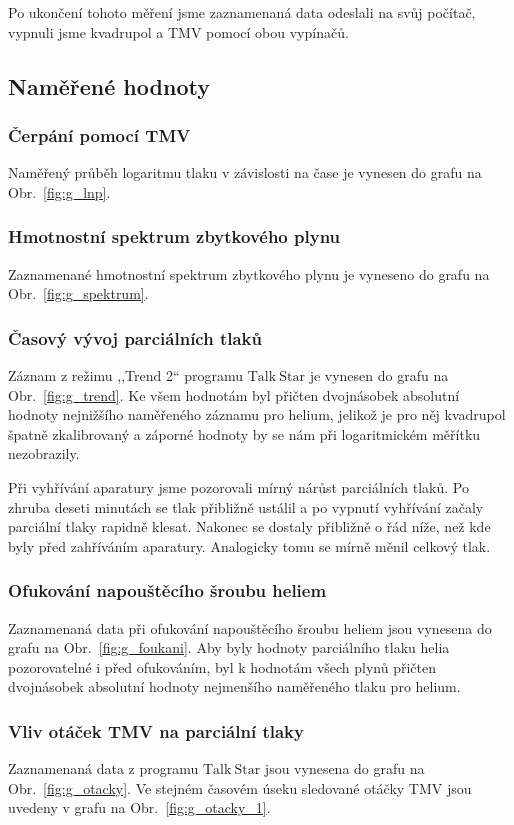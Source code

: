 \documentclass[english]{article}
\begin{document}
			Po ukončení tohoto měření jsme zaznamenaná data odeslali na svůj počítač, vypnuli jsme kvadrupol a TMV pomocí obou vypínačů.
		
	\subsection{Naměřené hodnoty}
		\subsubsection{Čerpání pomocí TMV}
			Naměřený průběh logaritmu tlaku v závislosti na čase je vynesen do grafu na Obr.~\ref{fig:g_lnp}.
			
		\subsubsection{Hmotnostní spektrum zbytkového plynu}
			Zaznamenané hmotnostní spektrum zbytkového plynu je vyneseno do grafu na Obr.~\ref{fig:g_spektrum}.
			
		\subsubsection{Časový vývoj parciálních tlaků}
			Záznam z režimu ,,Trend 2`` programu $\mathrm{Talk~Star}$ je vynesen do grafu na Obr.~\ref{fig:g_trend}. Ke všem hodnotám byl přičten dvojnásobek absolutní hodnoty nejnižšího naměřeného záznamu pro helium, jelikož je pro něj kvadrupol špatně zkalibrovaný a záporné hodnoty by se nám při logaritmickém měřítku nezobrazily.
			
			Při vyhřívání aparatury jsme pozorovali mírný nárůst parciálních tlaků. Po zhruba deseti minutách se tlak přibližně ustálil a po vypnutí vyhřívání začaly parciální tlaky rapidně klesat. Nakonec se dostaly přibližně o řád níže, než kde byly před zahříváním aparatury. Analogicky tomu se mírně měnil celkový tlak.
		
		\subsubsection{Ofukování napouštěcího šroubu heliem}
			Zaznamenaná data při ofukování napouštěcího šroubu heliem jsou vynesena do grafu na Obr.~\ref{fig:g_foukani}. Aby byly hodnoty parciálního tlaku helia pozorovatelné i před ofukováním, byl k hodnotám všech plynů přičten dvojnásobek absolutní hodnoty nejmenšího naměřeného tlaku pro helium.
		
		\subsubsection{Vliv otáček TMV na parciální tlaky}
			Zaznamenaná data z programu $\mathrm{Talk~Star}$ jsou vynesena do grafu na Obr.~\ref{fig:g_otacky}. Ve stejném časovém úseku sledované otáčky TMV jsou uvedeny v grafu na Obr.~\ref{fig:g_otacky_1}.
			
\end{document}
